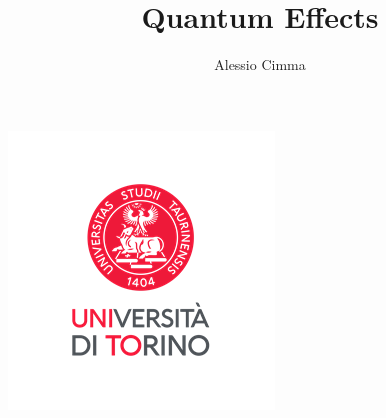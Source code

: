 \documentclass[demo]{article}
\title{Quantum Effects}
\author{Alessio Cimma}
\begin{document}
\maketitle

\begin{center}
	\includegraphics*[width=0.22\linewidth]{../images/logo.png}
\end{center}

\tableofcontents
\newpage

% 
% 
% 
% 
% 
% 
% 
% 
% 
% 
% 
% 
% 
% 
% 
% 
% 

\end{document}
